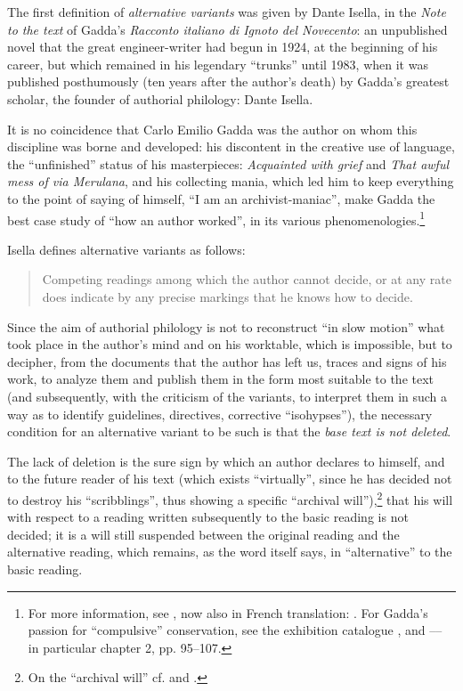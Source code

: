 \begin{paper}
The first definition of \emph{alternative variants} was given by
Dante Isella, in the \emph{Note to the text} of Gadda's \emph{Racconto
italiano di Ignoto del Novecento}: an unpublished novel that the great
engineer-writer had begun in 1924, at the beginning of his career, but
which remained in his legendary ``trunks'' until 1983, when it was
published posthumously (ten years after the author's death) by Gadda's
greatest scholar, the founder of authorial philology: Dante Isella.

It is no coincidence that Carlo Emilio Gadda was the author on whom this
discipline was borne and developed: his discontent in the creative use
of language, the ``unfinished'' status of his masterpieces:
\emph{Acquainted with grief} and \emph{That awful mess of via Merulana},
and his collecting mania, which led him to keep everything to the point
of saying of himself, ``I am an archivist-maniac'', make Gadda the best
case study of ``how an author worked'', in its various
phenomenologies.\footnote{For more information, see \cite{italia_come_2017}, now also in French translation: \cite{italia_dans_2022}. For Gadda's passion for ``compulsive'' conservation, see the
  exhibition catalogue \parencite{italia_io_2003}, and \cite{falkoff_possessed_2021} –– in particular
  chapter 2, pp. 95--107.}

Isella defines alternative variants as follows:

\begin{quote}
Competing readings among which the author cannot decide, or at any rate
does indicate by any precise markings that he knows how to
decide.
\begin{flushright}
\parencite[xxxiv]{isella_nota_1983}
\end{flushright}
\end{quote}

\noindent Since the aim of authorial philology is not to reconstruct ``in slow
motion'' what took place in the author's mind and on his worktable, which
is impossible, but to decipher, from the documents that the author has
left us, traces and signs of his work, to analyze them and publish them
in the form most suitable to the text (and subsequently, with the
criticism of the variants, to interpret them in such a way as to
identify guidelines, directives, corrective ``isohypses''), the necessary
condition for an alternative variant to be such is that the \emph{base
text is not deleted}.

The lack of deletion is the sure sign by which an author declares to
himself, and to the future reader of his text (which exists ``virtually'',
since he has decided not to destroy his ``scribblings'', thus showing a
specific ``archival will''),\footnote{On the ``archival will'' cf. \cite{albonico_autore_2015} and \cite{italia_italian_nodate}.} that
his will with respect to a reading written subsequently to the basic
reading is not decided; it is a will still suspended between the
original reading and the alternative reading, which remains, as the word
itself says, in ``alternative'' to the basic reading.


\end{paper}
